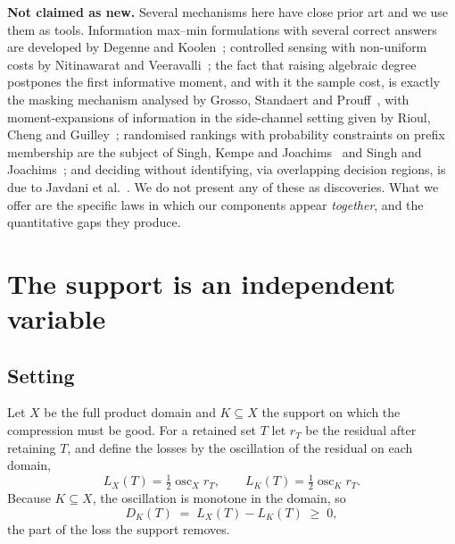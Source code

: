 \textbf{Not claimed as new.} Several mechanisms here have close prior art and we use them
as tools. Information max--min formulations with several correct answers are developed by
Degenne and Koolen~\cite{degenne2019}; controlled sensing with non-uniform costs by
Nitinawarat and Veeravalli~\cite{nitinawarat2013}; the fact that raising algebraic degree
postpones the first informative moment, and with it the sample cost, is exactly the
masking mechanism analysed by Grosso, Standaert and Prouff~\cite{grosso2014}, with
moment-expansions of information in the side-channel setting given by Rioul, Cheng and
Guilley~\cite{rioul2021}; randomised rankings with probability constraints on prefix
membership are the subject of Singh, Kempe and Joachims~\cite{singh2021} and
Singh and Joachims~\cite{singh2018}; and deciding without identifying, via overlapping
decision regions, is due to Javdani et al.~\cite{javdani2014}. We do not present any of
these as discoveries. What we offer are the specific laws in which our components appear
\emph{together}, and the quantitative gaps they produce.


\section{The support is an independent variable}
\label{sec:support}

\subsection{Setting}

Let $X$ be the full product domain and $K\subseteq X$ the support on which the compression
must be good. For a retained set $T$ let $r_{T}$ be the residual after retaining $T$, and
define the losses by the oscillation of the residual on each domain,
\begin{equation}
L_{X}(T)=\tfrac12\operatorname{osc}_{X}r_{T},\qquad
L_{K}(T)=\tfrac12\operatorname{osc}_{K}r_{T}.
\label{eq:twolosses}
\end{equation}
Because $K\subseteq X$, the oscillation is monotone in the domain, so
\begin{equation}
D_{K}(T)\;=\;L_{X}(T)-L_{K}(T)\;\ge\;0 ,
\label{eq:gap}
\end{equation}
the part of the loss the support removes.


